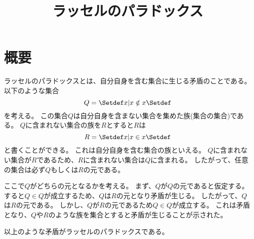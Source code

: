 \documentclass[uplatex, 11pt, a4j, dvipdfmx]{jsarticle}
\title{ラッセルのパラドックス}
\author{}
\date{}
\begin{document}
\maketitle

\section{概要}
  ラッセルのパラドックスとは、自分自身を含む集合に生じる矛盾のことである。
  以下のような集合
  \begin{equation}
    Q = \Set{ x | x \notin x }
  \end{equation}
  を考える。
  この集合$Q$は自分自身を含まない集合を集めた族(集合の集合)である。
  $Q$に含まれない集合の族を$R$とすると$R$は
  \begin{equation}
    R = \Set{ x | x \in x }
  \end{equation}
  と書くことができる。
  これは自分自身を含む集合の族といえる。
  $Q$に含まれない集合が$R$であるため、$R$に含まれない集合は$Q$に含まれる。
  したがって、任意の集合は必ず$Q$もしくは$R$の元である。

  ここで$Q$がどちらの元となるかを考える。
  まず、$Q$が$Q$の元であると仮定する。
  すると$Q \in Q$が成立するため、$Q$は$R$の元となり矛盾が生じる。
  したがって、$Q$は$R$の元である。
  しかし、$Q$が$R$の元であるため$Q \in Q$が成立する。
  これは矛盾となり、$Q$や$R$のような族を集合とすると矛盾が生じることが示された。

  以上のような矛盾がラッセルのパラドックスである。
\end{document}
